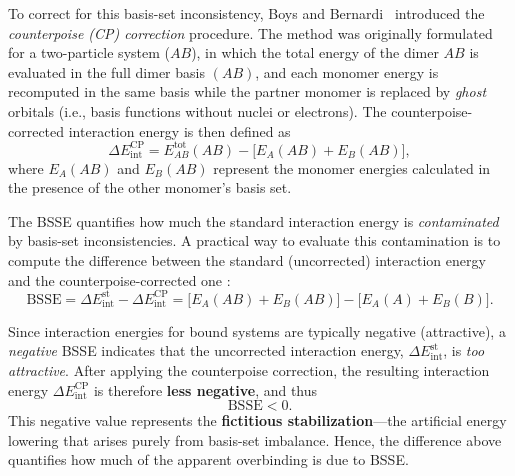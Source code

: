 To correct for this basis-set inconsistency,
Boys and Bernardi~\cite{Boys1970} introduced the
\textit{counterpoise (CP) correction} procedure.
The method was originally formulated for a two-particle system (\(AB\)),
in which the total energy of the dimer \(AB\)
is evaluated in the full dimer basis \((AB)\),
and each monomer energy is recomputed in the same basis
while the partner monomer is replaced by \emph{ghost} orbitals
(i.e., basis functions without nuclei or electrons).
The counterpoise-corrected interaction energy is then defined as
\begin{equation}
    \Delta E_{\mathrm{int}}^{\mathrm{CP}}
      = E^{\mathrm{tot}}_{AB}(AB)
        - \big[E_{A}(AB) + E_{B}(AB)\big],
    \label{eq:CP_correction_two_body}
\end{equation}
\noindent
where \(E_A(AB)\) and \(E_B(AB)\)
represent the monomer energies calculated in the presence of
the other monomer’s basis set.

\clearpage
The BSSE quantifies how much the standard interaction energy is
\textit{contaminated} by basis-set inconsistencies.
A practical way to evaluate this contamination is to compute
the difference between the standard (uncorrected) interaction energy
and the counterpoise-corrected one\autocite{Duijneveldt1994} :
\begin{equation}
\label{eq:BSSE_definition_two_body}
\mathrm{BSSE}
= \Delta E_{\mathrm{int}}^{\mathrm{st}} - \Delta E_{\mathrm{int}}^{\mathrm{CP}}
= \big[E_{A}(AB)+E_{B}(AB)\big] - \big[E_{A}(A)+E_{B}(B)\big].
\end{equation}

\noindent
Since interaction energies for bound systems are typically negative (attractive), a \emph{negative} BSSE indicates that the uncorrected interaction energy, $\Delta E_{\mathrm{int}}^{\mathrm{st}}$, is \textit{too attractive}. After applying the counterpoise correction, the resulting interaction energy $\Delta E_{\mathrm{int}}^{\mathrm{CP}}$ is therefore \textbf{less negative}, and thus
\[
\mathrm{BSSE} < 0.
\]
This negative value represents the \textbf{fictitious stabilization}—the artificial energy lowering that arises purely from basis-set imbalance. Hence, the difference above quantifies how much of the apparent overbinding is due to BSSE.


